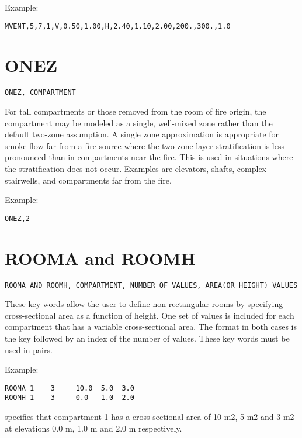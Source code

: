Example:

\begin{lstlisting}
MVENT,5,7,1,V,0.50,1.00,H,2.40,1.10,2.00,200.,300.,1.0
\end{lstlisting}

\section{ONEZ}

\begin{lstlisting}
ONEZ, COMPARTMENT
\end{lstlisting}

For tall compartments or those removed from the room of fire origin, the compartment may be modeled as a single, well-mixed zone rather than the default two-zone assumption. A single zone approximation is appropriate for smoke flow far from a fire source where the two-zone layer stratification is less pronounced than in compartments near the fire. This is used in situations where the stratification does not occur. Examples are elevators, shafts, complex stairwells, and compartments far from the fire.

Example:

\begin{lstlisting}
ONEZ,2
\end{lstlisting}

\section{ROOMA and ROOMH}

\begin{lstlisting}
ROOMA AND ROOMH, COMPARTMENT, NUMBER_OF_VALUES, AREA(OR HEIGHT) VALUES
\end{lstlisting}

These key words allow the user to define non-rectangular rooms by specifying cross-sectional area as a function of height. One set of values is included for each compartment that has a variable cross-sectional area. The format in both cases is the key followed by an index of the number of values. These key words must be used in pairs.

Example:

\begin{lstlisting}
ROOMA 1    3     10.0  5.0  3.0
ROOMH 1    3     0.0   1.0  2.0
\end{lstlisting}

specifies that compartment 1 has a cross-sectional area of 10 m2, 5 m2 and 3 m2 at elevations 0.0 m, 1.0 m and 2.0 m respectively.

